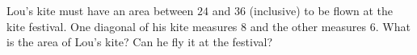 Lou's kite must have an area between $24$ and $36$ (inclusive) to be flown at the kite festival. One diagonal of his kite measures $8$ and the other measures $6$. What is the area of Lou's kite? Can he fly it at the festival?
